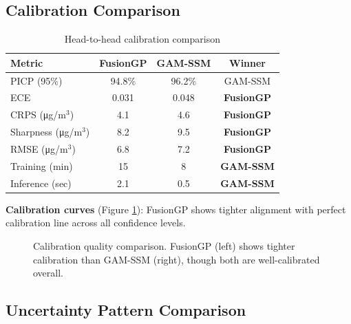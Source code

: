 \documentclass[11pt,letterpaper]{article}
\begin{document}
\subsection{Calibration Comparison}

\begin{table}[h]
\centering
\caption{Head-to-head calibration comparison}
\label{tab:comparison}
\begin{tabular}{@{}lccc@{}}
\toprule
\textbf{Metric} & \textbf{FusionGP} & \textbf{GAM-SSM} & \textbf{Winner} \\
\midrule
PICP (95\%) & 94.8\% & 96.2\% & GAM-SSM \\
ECE & 0.031 & 0.048 & \textbf{FusionGP} \\
CRPS (μg/m$^3$) & 4.1 & 4.6 & \textbf{FusionGP} \\
Sharpness (μg/m$^3$) & 8.2 & 9.5 & \textbf{FusionGP} \\
\midrule
RMSE (μg/m$^3$) & 6.8 & 7.2 & \textbf{FusionGP} \\
\midrule
Training (min) & 15 & 8 & \textbf{GAM-SSM} \\
Inference (sec) & 2.1 & 0.5 & \textbf{GAM-SSM} \\
\bottomrule
\end{tabular}
\end{table}

\textbf{Calibration curves} (Figure \ref{fig:calibration_comparison}): FusionGP shows tighter alignment with perfect calibration line across all confidence levels.

\begin{figure}[h]
\centering
\caption{Calibration quality comparison. FusionGP (left) shows tighter calibration than GAM-SSM (right), though both are well-calibrated overall.}
\label{fig:calibration_comparison}
\end{figure}

\subsection{Uncertainty Pattern Comparison}
\end{document}
